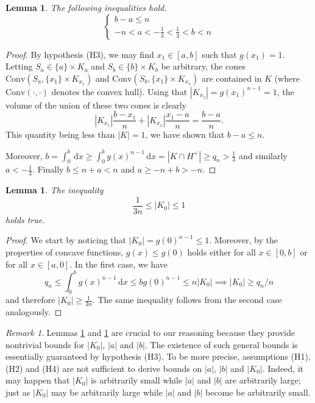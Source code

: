 \documentclass[12pt,reqno]{amsart}
\theoremstyle{plain}
\newtheorem{lema}[teor]{Lemma}
\theoremstyle{definition}
\theoremstyle{remark}
\newtheorem{nota}[teor]{Remark}
\numberwithin{equation}{section}
\newcommand{\dx}[0]{\,\mathrm{d}x}
\begin{document}
\begin{lema}\label{abbounds} The following inequalities hold.
\begin{equation*}
    \begin{cases}
        b-a\leq n\\
        -n<a<-\frac13<\frac13 < b < n
    \end{cases}
\end{equation*}
\end{lema}
\begin{proof}
    By hypothesis (H3), we may find $x_1\in[a,b]$ such that $g(x_1)=1$. Letting $S_a\in\{a\}\times K_a$ and $S_b\in\{b\}\times K_b$ be arbitrary, the cones $\mathrm{Conv}(S_a,\{x_1\}\times K_{x_1})$ and $\mathrm{Conv}(S_b,\{x_1\}\times K_{x_1})$ are contained in $K$ (where $\mathrm{Conv}(\cdot,\cdot)$ denotes the convex hull). Using that $|K_{x_1}|=g(x_1)^{n-1}=1$, the volume of the union of these two cones is clearly
    $$|K_{x_1}|\frac{b-x_1}{n}+|K_{x_1}|\frac{x_1-a}{n}=\frac{b-a}{n}.$$
    This quantity being less than $|K|=1$, we have shown that $b-a\leq n$.
    
    Moreover, $b=\int_0^b\dx\geq \int_0^bg(x)^{n-1}\dx=|K\cap H^+|\geq q_n>\frac 13$ and similarly $a<-\frac13$. Finally $b\leq n+a<n$ and $a\geq -n+b>-n$.
\end{proof}
\begin{lema}\label{k0bound}
    The inequality $$\frac 1 {3n}\leq |K_0|\leq 1$$ holds true.
\end{lema}
\begin{proof}
We start by noticing that $|K_0|=g(0)^{n-1}\leq 1$. Moreover, by the properties of concave functions, $g(x)\leq g(0)$ holds either for all $x\in[0,b]$ or for all $x\in[a,0]$. In the first case, we have $$q_n\leq \int _0^bg(x)^{n-1}\dx\leq bg(0)^{n-1}\leq n|K_0|\implies |K_0|\geq q_n/n$$and therefore $|K_0|\geq \frac 1 {3n}$. The same inequality follows from the second case analogously.
\end{proof}

\begin{nota}
    Lemmas \ref{abbounds} and \ref{k0bound} are crucial to our reasoning because they provide nontrivial bounds for $|K_0|$, $|a|$ and $|b|$. The existence of such general bounds is essentially guaranteed by hypothesis (H3). To be more precise, assumptions (H1), (H2) and (H4) are not sufficient to derive bounds on $|a|$, $|b|$ and $|K_0|$. Indeed, it may happen that $|K_0|$ is arbitrarily small while $|a|$ and $|b|$ are arbitrarily large; just as $|K_0|$ may be arbitrarily large while $|a|$ and $|b|$ become be arbitrarily small.

\end{nota}
\end{document}
